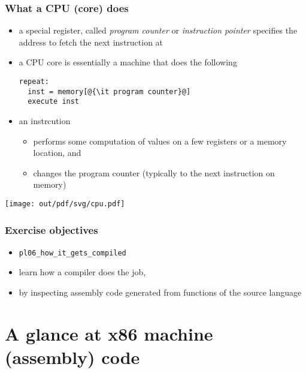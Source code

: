 \documentclass[12pt,dvipdfmx]{beamer}
\newcommand{\ao}[1]{{\color{blue}#1}}
\begin{document}
\begin{frame}[fragile]
  \frametitle{What a CPU (core) does}
  \begin{itemize}
  \item a special register, called \ao{\it program counter} or \ao{\it instruction pointer} specifies
    the address to fetch the next instruction at
  \item a CPU core is essentially a machine that does the following
    \begin{lstlisting}
repeat:
  inst = memory[@{\it program counter}@]
  execute inst
\end{lstlisting}
  \item an instrcution 
    \begin{itemize}
    \item performs some computation of values on a few registers or a memory location, and 
    \item changes the program counter (typically to the next instruction on memory)
    \end{itemize}
  \end{itemize}

  \begin{center}
    \texttt{[image: out/pdf/svg/cpu.pdf]}
  \end{center}
\end{frame}

\begin{frame}[fragile]
  \frametitle{Exercise objectives}
  \begin{itemize}
  \item {\tt pl06\_how\_it\_gets\_compiled}
  \item learn how a \ao{compiler} does the job, 
  \item by inspecting assembly code generated from functions
    of the source language
  \end{itemize}
\end{frame}

\section{A glance at x86 machine (assembly) code}
\end{document}
